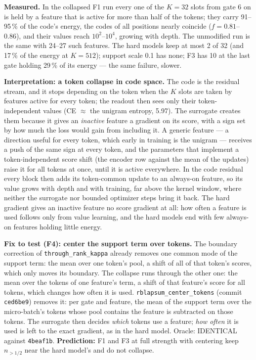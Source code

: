 \documentclass[11pt,a4paper]{article}
\newcommand{\code}[1]{\texttt{#1}}
\begin{document}
\textbf{Measured.}  In the collapsed F1 run every one of the \(K=32\) slots from gate 6 on is held by a feature that
is active for more than half of the tokens; they carry 91--95\,\% of the code's energy, the codes of all positions
nearly coincide (\(f=0.81\)--0.86), and their values reach \(10^2\)--\(10^4\), growing with depth.  The unmodified run
is the same with 24--27 such features.  The hard models keep at most 2 of 32 (and 17\,\% of the energy at
\(K=512\)); support scale 0.1 has none; F3 has 10 at the last gate holding 29\,\% of its energy --- the same failure,
slower.

\textbf{Interpretation: a token collapse in code space.}  The code is the residual stream, and it stops depending on
the token when the \(K\) slots are taken by features active for every token; the readout then sees only their
token-independent values (CE \(\approx\) the unigram entropy, 5.97).  The surrogate creates them because it gives an
\emph{inactive} feature a gradient on its score, with a sign set by how much the loss would gain from including it.
A generic feature --- a direction useful for every token, which early in training is the unigram --- receives a push
of the same sign at every token, and the parameters that implement a token-independent score shift (the encoder row
against the mean of the updates) raise it for all tokens at once, until it is active everywhere.  In the code
residual every block then adds its token-common update to an always-on feature, so its value grows with depth and
with training, far above the kernel window, where neither the surrogate nor bounded optimizer steps bring it back.
The hard gradient gives an inactive feature no score gradient at all: how often a feature is used follows only from
value learning, and the hard models end with few always-on features holding little energy.

\textbf{Fix to test (F4): center the support term over tokens.}  The boundary correction of
\code{through\_rank\_kappa} already removes one common mode of the support term: the mean over one token's pool, a
shift of all of that token's scores, which only moves its boundary.  The collapse runs through the other one: the
mean over the tokens of one feature's term, a shift of that feature's score for all tokens, which changes how often
it is used.  \code{rblapsum\_center\_tokens} (commit \code{ced6be9}) removes it: per gate and feature, the mean of the
support term over the micro-batch's tokens whose pool contains the feature is subtracted on those tokens.  The
surrogate then decides \emph{which} tokens use a feature; \emph{how often} it is used is left to the exact gradient,
as in the hard model.  Oracle: IDENTICAL against \code{4beaf1b}.  \textbf{Prediction:} F1 and F3 at full strength
with centering keep \(n_{>1/2}\) near the hard model's and do not collapse.
\end{document}
